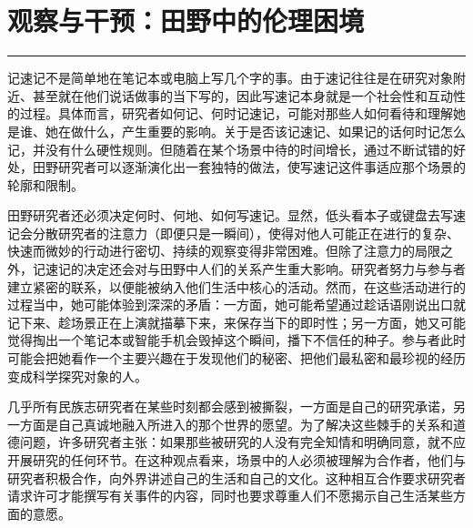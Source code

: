 \documentclass[12pt,a4paper]{article}
\begin{document}
\section{观察与干预：田野中的伦理困境}
\vspace{0.5em}
\vspace{0.3em}

\noindent\rule{\textwidth}{0.4pt}

\vspace{0.3em}



记速记不是简单地在笔记本或电脑上写几个字的事。由于速记往往是在研究对象附近、甚至就在他们说话做事的当下写的，因此写速记本身就是一个社会性和互动性的过程。具体而言，研究者如何记、何时记速记，可能对那些人如何看待和理解她是谁、她在做什么，产生重要的影响。关于是否该记速记、如果记的话何时记怎么记，并没有什么硬性规则。但随着在某个场景中待的时间增长，通过不断试错的好处，田野研究者可以逐渐演化出一套独特的做法，使写速记这件事适应那个场景的轮廓和限制。



\vspace{0.2em}



田野研究者还必须决定何时、何地、如何写速记。显然，低头看本子或键盘去写速记会分散研究者的注意力（即便只是一瞬间），使得对他人可能正在进行的复杂、快速而微妙的行动进行密切、持续的观察变得非常困难。但除了注意力的局限之外，记速记的决定还会对与田野中人们的关系产生重大影响。研究者努力与参与者建立紧密的联系，以便能被纳入他们生活中核心的活动。然而，在这些活动进行的过程当中，她可能体验到深深的矛盾：一方面，她可能希望通过趁话语刚说出口就记下来、趁场景正在上演就描摹下来，来保存当下的即时性；另一方面，她又可能觉得掏出一个笔记本或智能手机会毁掉这个瞬间，播下不信任的种子。参与者此时可能会把她看作一个主要兴趣在于发现他们的秘密、把他们最私密和最珍视的经历变成科学探究对象的人。



几乎所有民族志研究者在某些时刻都会感到被撕裂，一方面是自己的研究承诺，另一方面是自己真诚地融入所进入的那个世界的愿望。为了解决这些棘手的关系和道德问题，许多研究者主张：如果那些被研究的人没有完全知情和明确同意，就不应开展研究的任何环节。在这种观点看来，场景中的人必须被理解为合作者，他们与研究者积极合作，向外界讲述自己的生活和自己的文化。这种相互合作要求研究者请求许可才能撰写有关事件的内容，同时也要求尊重人们不愿揭示自己生活某些方面的意愿。
\end{document}
